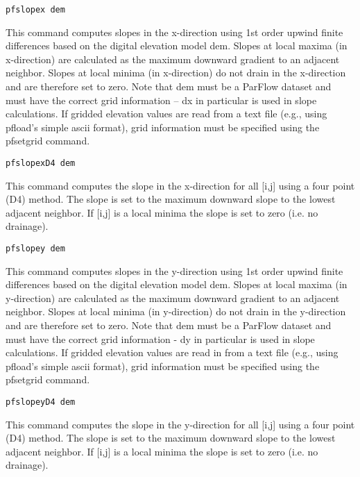 \begin{description}
\item{\begin{verbatim}pfslopex dem\end{verbatim}}
This command computes slopes in the x-direction using 1st order upwind
finite differences based on the digital elevation model dem. Slopes at local
maxima (in x-direction) are calculated as the maximum downward gradient to
an adjacent neighbor. Slopes at local minima (in x-direction) do not drain in
the x-direction and are therefore set to zero. Note that dem must be a
ParFlow dataset and must have the correct grid information -- dx in particular
is used in slope calculations. If gridded elevation values are read from a text
file (e.g., using pfload's simple ascii format), grid information must be
specified using the pfsetgrid command.

\item{\begin{verbatim}pfslopexD4 dem\end{verbatim}}
This command computes the slope in the x-direction for all [i,j] using a
four point (D4) method. The slope is set to the maximum downward slope to the
lowest adjacent neighbor. If [i,j] is a local minima the slope is set to zero (i.e. no drainage).


\item{\begin{verbatim}pfslopey dem\end{verbatim}}
This command computes slopes in the y-direction using 1st order upwind
finite differences based on the digital elevation model dem. Slopes at local
maxima (in y-direction) are calculated as the maximum downward gradient to
an adjacent neighbor. Slopes at local minima (in y-direction) do not drain in
the y-direction and are therefore set to zero. Note that dem must be a
ParFlow dataset and must have the correct grid information - dy in particular
is used in slope calculations. If gridded elevation values are read in from a
text file (e.g., using pfload's simple ascii format), grid information must be
specified using the pfsetgrid command.


\item{\begin{verbatim}pfslopeyD4 dem\end{verbatim}}
This command computes the slope in the y-direction for all [i,j] using a four point (D4) method.
The slope is set to the maximum downward slope to the lowest adjacent neighbor. If [i,j] is a local
minima the slope is set to zero (i.e. no drainage).



\end{description}

